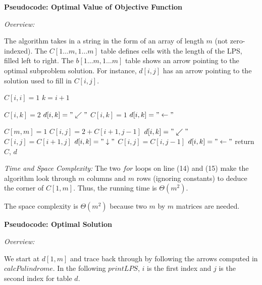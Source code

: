 \documentclass[a4paper]{report}
\begin{document}
\begin{enumerate}
      {\bf Pseudocode: Optimal Value of Objective Function}

      {\it Overview:}

      The algorithm takes in a string in the form of an array of length $m$ (not zero-indexed). 
      The $C[1\dots m, 1\dots m]$ table defines cells with the length of the LPS, filled left to right.
      The $b[1\dots m, 1\dots m]$ table shows an arrow pointing to the optimal subproblem solution. For instance, 
      $d[i, j]$ has an arrow pointing to the solution used to fill in $C[i, j]$.


      \begin{algorithmic}[1]


            \State $C[i,i] = 1$
            \State $k = i + 1$

              \State $C[i,k] = 2$
              \State $d[i,k] = "\swarrow"$
            \Else
              \State $C[i,k] = 1$
              \State $d[i,k] = "\leftarrow"$
            \EndIf
          \EndFor

          \State $C[m,m] = 1$
                \State $C[i,j] = 2+ C[i+1, j-1]$ 
                \State $d[i,k] = "\swarrow"$
                \State $C[i,j] = C[i+1, j]$ 
                \State $d[i,k] = "\downarrow"$
                \State $C[i,j] = C[i, j-1]$ 
                \State $d[i,k] = "\leftarrow"$
              \EndIf
            \EndFor
          \EndFor
          \State return $C$, $d$
        \EndFunction
      \end{algorithmic}

      {\it Time and Space Complexity:}
      The two $for$ loops on line (14) and (15) make the algorithm look through $m$ columns and $m$ rows (ignoring constants) to 
      deduce the corner of $C[1,m]$.
      Thus, the running time is $\Theta(m^2)$.

      The space complexity is $\Theta(m^2)$ because two $m$ by $m$ matrices are needed. 


      {\bf Pseudocode: Optimal Solution}

      {\it Overview:}

      We start at $d[1, m]$ and trace back through by following the arrows computed in $calcPalindrome$.
      In the following $printLPS$, $i$ is the first index and $j$ is the second index for table $d$. 


\end{enumerate}
\end{document}
